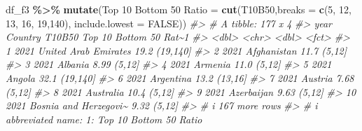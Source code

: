 \documentclass[
  xelatex, ja=standard]{bxjsbook}
\newenvironment{Shaded}{\begin{snugshade}}{\end{snugshade}}
\newcommand{\AttributeTok}[1]{\textcolor[rgb]{0.13,0.29,0.53}{#1}}
\newcommand{\CommentTok}[1]{\textcolor[rgb]{0.56,0.35,0.01}{\textit{#1}}}
\newcommand{\ConstantTok}[1]{\textcolor[rgb]{0.56,0.35,0.01}{#1}}
\newcommand{\DecValTok}[1]{\textcolor[rgb]{0.00,0.00,0.81}{#1}}
\newcommand{\FunctionTok}[1]{\textcolor[rgb]{0.13,0.29,0.53}{\textbf{#1}}}
\newcommand{\NormalTok}[1]{#1}
\newcommand{\OtherTok}[1]{\textcolor[rgb]{0.56,0.35,0.01}{#1}}
\newcommand{\SpecialCharTok}[1]{\textcolor[rgb]{0.81,0.36,0.00}{\textbf{#1}}}
\newcommand{\StringTok}[1]{\textcolor[rgb]{0.31,0.60,0.02}{#1}}
\theoremstyle{definition}
\theoremstyle{definition}
\theoremstyle{definition}
\theoremstyle{definition}
\theoremstyle{remark}
\begin{document}
\begin{Shaded}
\begin{Highlighting}[]
\NormalTok{df\_f3 }\SpecialCharTok{\%\textgreater{}\%} 
  \FunctionTok{mutate}\NormalTok{(}\StringTok{\textasciigrave{}}\AttributeTok{Top 10 Bottom 50 Ratio}\StringTok{\textasciigrave{}} \OtherTok{=} \FunctionTok{cut}\NormalTok{(T10B50,}\AttributeTok{breaks =} \FunctionTok{c}\NormalTok{(}\DecValTok{5}\NormalTok{, }\DecValTok{12}\NormalTok{, }\DecValTok{13}\NormalTok{, }\DecValTok{16}\NormalTok{, }\DecValTok{19}\NormalTok{,}\DecValTok{140}\NormalTok{), }
                                        \AttributeTok{include.lowest =} \ConstantTok{FALSE}\NormalTok{)) }
\CommentTok{\#\textgreater{} \# A tibble: 177 x 4}
\CommentTok{\#\textgreater{}     year Country               T10B50 Top 10 Bottom 50 Rat\textasciitilde{}1}
\CommentTok{\#\textgreater{}    \textless{}dbl\textgreater{} \textless{}chr\textgreater{}                  \textless{}dbl\textgreater{} \textless{}fct\textgreater{}                 }
\CommentTok{\#\textgreater{}  1  2021 United Arab Emirates   19.2  (19,140]              }
\CommentTok{\#\textgreater{}  2  2021 Afghanistan            11.7  (5,12]                }
\CommentTok{\#\textgreater{}  3  2021 Albania                 8.99 (5,12]                }
\CommentTok{\#\textgreater{}  4  2021 Armenia                11.0  (5,12]                }
\CommentTok{\#\textgreater{}  5  2021 Angola                 32.1  (19,140]              }
\CommentTok{\#\textgreater{}  6  2021 Argentina              13.2  (13,16]               }
\CommentTok{\#\textgreater{}  7  2021 Austria                 7.68 (5,12]                }
\CommentTok{\#\textgreater{}  8  2021 Australia              10.4  (5,12]                }
\CommentTok{\#\textgreater{}  9  2021 Azerbaijan              9.63 (5,12]                }
\CommentTok{\#\textgreater{} 10  2021 Bosnia and Herzegovi\textasciitilde{}   9.32 (5,12]                }
\CommentTok{\#\textgreater{} \# i 167 more rows}
\CommentTok{\#\textgreater{} \# i abbreviated name: 1: \textasciigrave{}Top 10 Bottom 50 Ratio\textasciigrave{}}
\end{Highlighting}
\end{Shaded}
\end{document}
